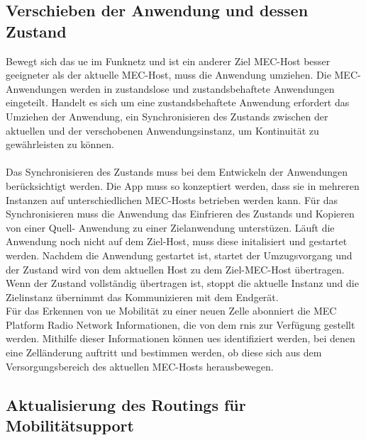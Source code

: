 \documentclass[runningheads]{llncs}
\numberwithin{figure}{section}
\begin{document}
\subsection{Verschieben der Anwendung und dessen Zustand}
Bewegt sich das \acrshort{ue} im Funknetz und ist ein anderer Ziel MEC-Host besser geeigneter als der aktuelle
MEC-Host, muss die Anwendung umziehen. Die MEC-Anwendungen werden in zustandslose und zustandsbehaftete Anwendungen eingeteilt.
Handelt es sich um eine zustandsbehaftete Anwendung 
erfordert das Umziehen der Anwendung, ein Synchronisieren des Zustands zwischen der aktuellen und der
verschobenen Anwendungsinstanz, um Kontinuität zu gewährleisten zu können.
\\
\\
Das Synchronisieren des Zustands muss bei dem Entwickeln der Anwendungen berücksichtigt werden. Die App muss so konzeptiert werden, 
dass sie in mehreren Instanzen auf unterschiedlichen MEC-Hosts betrieben werden kann. 
Für das Synchronisieren muss die Anwendung das Einfrieren des Zustands und Kopieren von einer Quell- Anwendung 
zu einer Zielanwendung unterstüzen. 
Läuft die Anwendung noch nicht auf dem Ziel-Host, muss diese initalisiert und gestartet werden.
Nachdem die Anwendung gestartet ist, startet der Umzugsvorgang und der Zustand wird von dem aktuellen 
Host zu dem Ziel-MEC-Host übertragen. Wenn der Zustand vollständig übertragen ist, stoppt die aktuelle Instanz
und die Zielinstanz übernimmt das Kommunizieren mit dem Endgerät. \cite{DevelopingSoftwareMultiAccess}
\\
Für das Erkennen von \acrshort{ue} Mobilität zu einer neuen Zelle abonniert die MEC Platform Radio Network Informationen, die von dem \acrfull{rnis} zur
Verfügung gestellt werden. Mithilfe dieser Informationen können \acrshort{ue}s identifiziert werden, bei denen eine Zelländerung auftritt 
und bestimmen werden, ob diese sich aus dem Versorgungsbereich des aktuellen MEC-Hosts herausbewegen.
\subsection{Aktualisierung des Routings für Mobilitätsupport}
\end{document}
